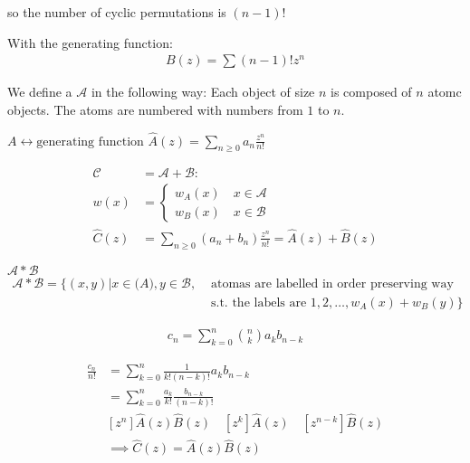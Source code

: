 so the number of cyclic permutations is $(n-1)!$

With the generating function: 
\begin{align*}
    B(z) = \sum (n-1)! z^n
\end{align*}

\begin{definition}
We define a  $\mathcal{A}$ in the following way: Each object of size $n$ is composed of $n$ atomc objects. The atoms are numbered with numbers from $1$ to $n$. 
\end{definition}
$A \leftrightarrow \text{generating function } \hat{A}(z) = \sum_{n\geq 0} a_n \frac{z^n}{n!}$

\begin{align*}
    \mathcal{C} &= \mathcal{A}+\mathcal{B}: \\
         w(x) &= \begin{cases}
                w_A(x) \quad x\in \mathcal{A}\\
                w_B(x) \quad x\in \mathcal{B}
				\end{cases}\\
    \hat{C}(z) &= \sum_{n\geq 0} (a_n+b_n) \frac{z^n}{n!}
        = \hat{A}(z) + \hat{B}(z)
\end{align*}

\begin{definition}
$\mathcal{A} * \mathcal{B}$ \\
\begin{align*}
  \mathcal{A} * \mathcal{B} = \{ (x,y) | x \in \mathcal(A), y \in \mathcal{B}, 
    &\text{ atomas are labelled in order preserving way }\\
    &\text{ s.t. the labels are } 1,2, \dotsc , w_A(x) + w_B(y) \}
\end{align*}
\end{definition}

\begin{align*}
    c_n = \sum_{k=0}^{n} {n \choose k} a_k b_{n-k}
\end{align*}


\begin{align*}
    \frac{c_n}{n!} &= \sum_{k=0}^{n} \frac{1}{k!(n-k)!} a_k b_{n-k}\\
    &= \sum_{k=0}^{n} \frac{a_k}{k!} \frac{b_{n-k}}{(n-k)!} \\
    &[z^n] \hat{A}(z)\hat{B}(z) 
        \quad [z^k] \hat{A}(z) 
        \quad [z^{n-k}] \hat{B}(z) \\
    &\implies \hat{C}(z) = \hat{A}(z) \hat{B}(z) \\
\end{align*}

